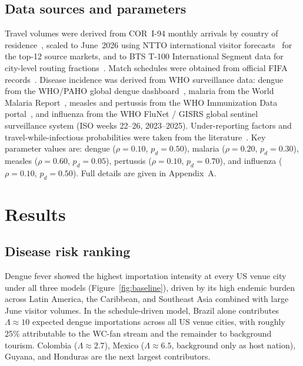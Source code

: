 \documentclass[12pt]{article}
\begin{document}
\subsection*{Data sources and parameters}

Travel volumes were derived from COR~I-94 monthly arrivals by country
of residence~\cite{CBP_I94}, scaled to June~2026 using NTTO
international visitor forecasts~\cite{NTTO2025} for the top-12
source markets, and to BTS T-100 International Segment data for
city-level routing fractions~\cite{BTS_T100}. Match schedules were
obtained from official FIFA records~\cite{FIFA2026_schedule}.
Disease incidence was derived from WHO surveillance data: dengue
from the WHO/PAHO global dengue dashboard~\cite{WHO_dengue},
malaria from the World Malaria Report~\cite{whoWMR2024}, measles
and pertussis from the WHO Immunization Data
portal~\cite{WHO_immunization}, and influenza from the WHO FluNet /
GISRS global sentinel surveillance system (ISO weeks 22--26,
2023--2025). Under-reporting factors and travel-while-infectious
probabilities were taken from the
literature~\cite{bhatt2013,undurraga2013,whoWMR2024,simons2012,mclaughlin2016}.
Key parameter values are: dengue ($\rho=0.10$, $p_d=0.50$), malaria
($\rho=0.20$, $p_d=0.30$), measles ($\rho=0.60$, $p_d=0.05$),
pertussis ($\rho=0.10$, $p_d=0.70$), and influenza ($\rho=0.10$,
$p_d=0.50$). Full details are given in Appendix~A.

\section*{Results}

\subsection*{Disease risk ranking}

Dengue fever showed the highest importation intensity at every US
venue city under all three models (Figure~\ref{fig:baseline}),
driven by its high endemic burden across Latin America, the
Caribbean, and Southeast Asia combined with large June visitor
volumes. In the schedule-driven model, Brazil alone contributes
$\Lambda \approx 10$ expected dengue importations across all US venue
cities, with roughly 25\% attributable to the WC-fan stream and the
remainder to background tourism. Colombia ($\Lambda \approx 2.7$),
Mexico ($\Lambda \approx 6.5$, background only as host nation),
Guyana, and Honduras are the next largest contributors.
\end{document}
